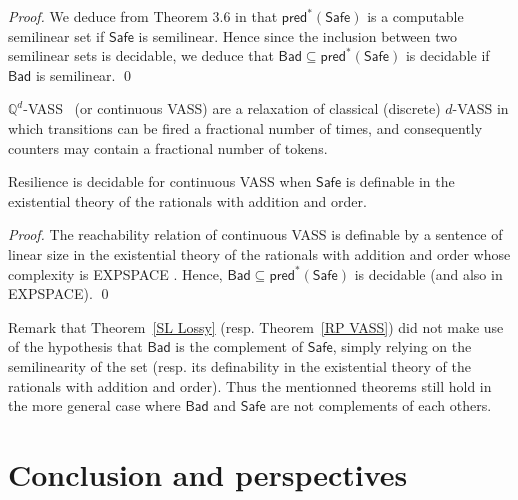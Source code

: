 \documentclass[runningheads]{llncs}
\newcommand{\pred}{\textsf{pred}}
\newcommand{\Bad}{\textsf{Bad}}
\newcommand{\Safe}{\textsf{Safe}}
\begin{document}
\begin{proof}
We deduce from Theorem 3.6 in \cite{DBLP:conf/rp/Schnoebelen10} that $\pred^*(\Safe)$ is a computable semilinear set if $\Safe$ is semilinear. Hence since the inclusion between two semilinear sets is decidable, we deduce that $\Bad \subseteq \pred^*(\Safe)$ is decidable if $\Bad$ is semilinear. \qed
\end{proof}






$\mathds{Q}^d$-VASS~\cite{DBLP:journals/tocl/BlondinFHH17} (or continuous VASS) are a relaxation of classical (discrete) $d$-VASS in which transitions can be fired a fractional number of times, and consequently counters may contain a fractional number of tokens.

\begin{theorem}\label{RP VASS}
{\sc Resilience} is decidable for continuous VASS when $\Safe$  is
definable in the existential theory of the rationals with addition and order.
\end{theorem}

\begin{proof}
The reachability relation of continuous VASS is definable by a sentence of linear size in the existential theory of
the rationals with addition and order whose complexity is EXPSPACE \cite{DBLP:journals/tocl/BlondinFHH17}. Hence, $\Bad \subseteq \pred^*(\Safe)$ is decidable (and also in EXPSPACE). \qed
\end{proof}


Remark that
Theorem~\ref{SL Lossy} 
(resp. Theorem~\ref{RP VASS})
did not make use of the hypothesis that $\Bad$ is the complement of $\Safe$, simply relying on the
semilinearity of the set (resp. its definability in the existential theory of the rationals with addition and order). Thus 
the mentionned theorems still hold in the more general case where $\Bad$ and $\Safe$ are not complements of each others.










\section{Conclusion and perspectives}
\end{document}

